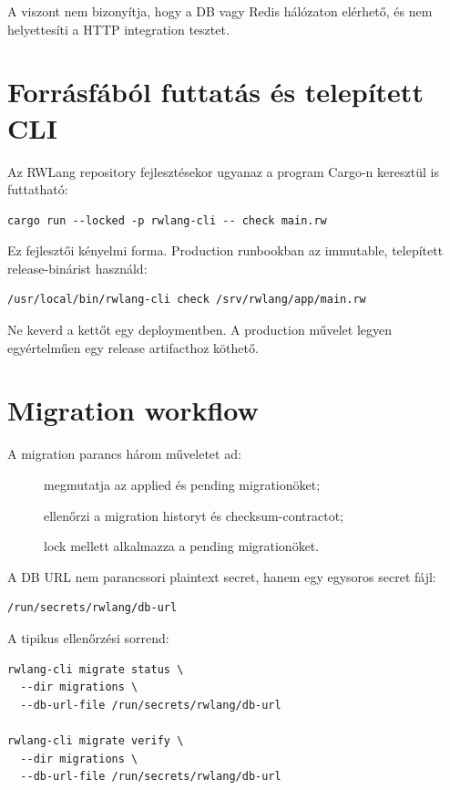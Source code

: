 A  viszont nem bizonyítja, hogy a DB vagy Redis hálózaton elérhető, és nem helyettesíti a HTTP integration tesztet.

\section{Forrásfából futtatás és telepített CLI}

Az RWLang repository fejlesztésekor ugyanaz a program Cargo-n keresztül is futtatható:

\begin{lstlisting}
cargo run --locked -p rwlang-cli -- check main.rw
\end{lstlisting}

Ez fejlesztői kényelmi forma. Production runbookban az immutable, telepített release-binárist használd:

\begin{lstlisting}
/usr/local/bin/rwlang-cli check /srv/rwlang/app/main.rw
\end{lstlisting}

Ne keverd a kettőt egy deploymentben. A production művelet legyen egyértelműen egy release artifacthoz köthető.

\section{Migration workflow}

A migration parancs három műveletet ad:

\begin{description}
  \item[] megmutatja az applied és pending migrationöket;
  \item[] ellenőrzi a migration historyt és checksum-contractot;
  \item[] lock mellett alkalmazza a pending migrationöket.
\end{description}

A DB URL nem parancssori plaintext secret, hanem egy egysoros secret fájl:

\begin{lstlisting}
/run/secrets/rwlang/db-url
\end{lstlisting}

A tipikus ellenőrzési sorrend:

\begin{lstlisting}
rwlang-cli migrate status \
  --dir migrations \
  --db-url-file /run/secrets/rwlang/db-url

rwlang-cli migrate verify \
  --dir migrations \
  --db-url-file /run/secrets/rwlang/db-url
\end{lstlisting}

